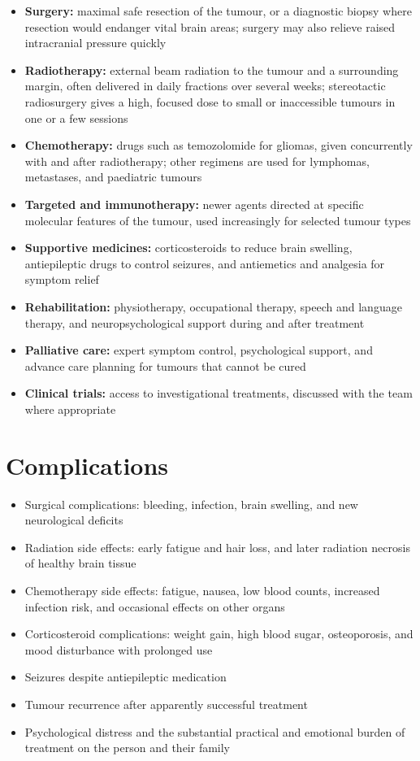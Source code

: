 \begin{itemize}
    \item \textbf{Surgery:} maximal safe resection of the tumour, or a diagnostic biopsy where resection would endanger vital brain areas; surgery may also relieve raised intracranial pressure quickly
    \item \textbf{Radiotherapy:} external beam radiation to the tumour and a surrounding margin, often delivered in daily fractions over several weeks; stereotactic radiosurgery gives a high, focused dose to small or inaccessible tumours in one or a few sessions
    \item \textbf{Chemotherapy:} drugs such as temozolomide for gliomas, given concurrently with and after radiotherapy; other regimens are used for lymphomas, metastases, and paediatric tumours
    \item \textbf{Targeted and immunotherapy:} newer agents directed at specific molecular features of the tumour, used increasingly for selected tumour types
    \item \textbf{Supportive medicines:} corticosteroids to reduce brain swelling, antiepileptic drugs to control seizures, and antiemetics and analgesia for symptom relief
    \item \textbf{Rehabilitation:} physiotherapy, occupational therapy, speech and language therapy, and neuropsychological support during and after treatment
    \item \textbf{Palliative care:} expert symptom control, psychological support, and advance care planning for tumours that cannot be cured
    \item \textbf{Clinical trials:} access to investigational treatments, discussed with the team where appropriate
\end{itemize}

\section*{Complications}
\begin{itemize}
    \item Surgical complications: bleeding, infection, brain swelling, and new neurological deficits
    \item Radiation side effects: early fatigue and hair loss, and later radiation necrosis of healthy brain tissue
    \item Chemotherapy side effects: fatigue, nausea, low blood counts, increased infection risk, and occasional effects on other organs
    \item Corticosteroid complications: weight gain, high blood sugar, osteoporosis, and mood disturbance with prolonged use
    \item Seizures despite antiepileptic medication
    \item Tumour recurrence after apparently successful treatment
    \item Psychological distress and the substantial practical and emotional burden of treatment on the person and their family
\end{itemize}

